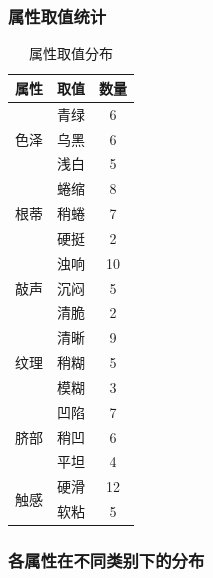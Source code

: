 \documentclass[12pt,a4paper]{ctexart}
\begin{document}
\subsubsection{属性取值统计}

\begin{table}[H]
\centering
\caption{属性取值分布}
\begin{tabular}{ccc}
\toprule
\textbf{属性} & \textbf{取值} & \textbf{数量} \\
\midrule
\multirow{3}{*}{色泽} & 青绿 & 6 \\
& 乌黑 & 6 \\
& 浅白 & 5 \\
\midrule
\multirow{3}{*}{根蒂} & 蜷缩 & 8 \\
& 稍蜷 & 7 \\
& 硬挺 & 2 \\
\midrule
\multirow{3}{*}{敲声} & 浊响 & 10 \\
& 沉闷 & 5 \\
& 清脆 & 2 \\
\midrule
\multirow{3}{*}{纹理} & 清晰 & 9 \\
& 稍糊 & 5 \\
& 模糊 & 3 \\
\midrule
\multirow{3}{*}{脐部} & 凹陷 & 7 \\
& 稍凹 & 6 \\
& 平坦 & 4 \\
\midrule
\multirow{2}{*}{触感} & 硬滑 & 12 \\
& 软粘 & 5 \\
\bottomrule
\end{tabular}
\end{table}

\subsubsection{各属性在不同类别下的分布}
\end{document}

